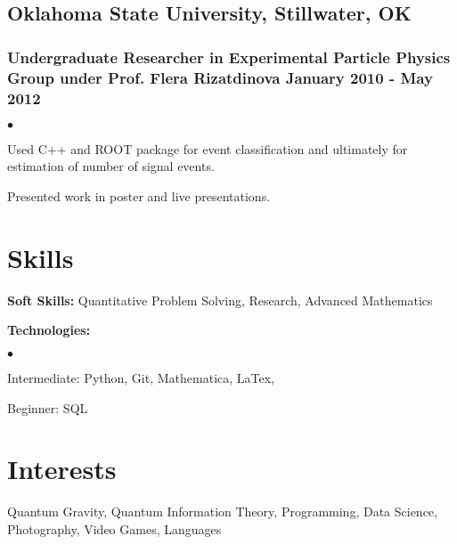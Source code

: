 \documentclass[letterpaper]{article}
\renewenvironment{itemize}{
  \begin{list}{$\bullet$}{
    \setlength{\itemsep}{0em}
    \setlength{\parskip}{0em}
    \setlength{\parsep}{0em} 
    \setlength{\topsep}{0em} 
  }
}{
  \end{list}
}
\begin{document}
\subsection*{Oklahoma State University, Stillwater, OK}
\subsubsection*{Undergraduate Researcher in Experimental Particle Physics Group under Prof. Flera Rizatdinova \hfill January 2010 - May 2012}
    \begin{itemize}
        \item Used C++ and ROOT package for event classification and ultimately for estimation of number of signal events.
        \item Presented work in poster and live presentations.
    \end{itemize}
    

\section*{Skills}

{\bf Soft Skills:} Quantitative Problem Solving, Research, Advanced Mathematics

{\bf Technologies:}
\begin{itemize}
	\item[] Intermediate: Python, Git, Mathematica, LaTex, 
	\item[] Beginner: SQL%
\end{itemize}
 


\section*{Interests}

Quantum Gravity, Quantum Information Theory, Programming, Data Science, Photography, Video Games, Languages
\end{document}
